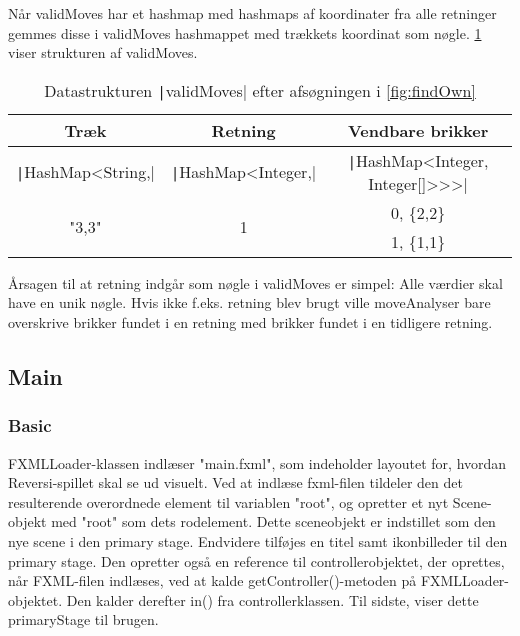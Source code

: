 Når validMoves har et hashmap med hashmaps af koordinater fra alle retninger gemmes disse i validMoves hashmappet med trækkets koordinat som nøgle. \cref{tbl:hashmaps} viser strukturen af validMoves.
\begin{table}[H]
    \centering
    \caption{Datastrukturen \texttt|validMoves| efter afsøgningen i \cref{fig:findOwn}}\label{tbl:hashmaps}
    \begin{tabular}{ccc}
        \toprule
        Træk                               & Retning                             & Vendbare brikker                                 \\
        \midrule
        \texttt|HashMap<String,| & \texttt|HashMap<Integer,| & \texttt|HashMap<Integer, Integer[]>>>| \\
        \multirow{2}{*}{"3,3"}             & \multirow{2}{*}{1}                  & 0, \{2,2\}                                       \\
                                           &                                     & 1, \{1,1\}                                       \\
        \bottomrule
    \end{tabular}
\end{table}
Årsagen til at retning indgår som nøgle i validMoves er simpel: Alle værdier skal have en unik nøgle. Hvis ikke f.eks. retning blev brugt ville moveAnalyser bare overskrive brikker fundet i en retning med brikker fundet i en tidligere retning.
\subsection{Main}

\subsubsection{Basic}\label{bm}
FXMLLoader-klassen indlæser "main.fxml", som indeholder layoutet for, hvordan Reversi-spillet skal se ud visuelt. Ved at indlæse fxml-filen tildeler den det resulterende overordnede element til variablen "root", og opretter et nyt Scene-objekt med "root" som dets rodelement. Dette sceneobjekt er indstillet som den nye scene i den primary stage. Endvidere tilføjes en titel samt ikonbilleder til den primary stage. Den opretter også en reference til controllerobjektet, der oprettes, når FXML-filen indlæses, ved at kalde getController()-metoden på FXMLLoader-objektet. Den kalder derefter in() fra controllerklassen. Til sidste, viser dette primaryStage til brugen.


